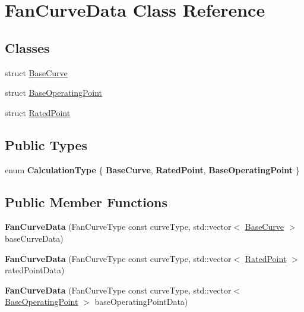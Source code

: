 \hypertarget{class_fan_curve_data}{}\section{Fan\+Curve\+Data Class Reference}
\label{class_fan_curve_data}
\subsection*{Classes}
\begin{DoxyCompactItemize}
\item 
struct \hyperlink{struct_fan_curve_data_1_1_base_curve}{Base\+Curve}
\item 
struct \hyperlink{struct_fan_curve_data_1_1_base_operating_point}{Base\+Operating\+Point}
\item 
struct \hyperlink{struct_fan_curve_data_1_1_rated_point}{Rated\+Point}
\end{DoxyCompactItemize}
\subsection*{Public Types}
\begin{DoxyCompactItemize}
\item 
\mbox{\label{class_fan_curve_data_af87fafad0a2a00e26ba82fb33b1a7282}} 
enum {\bfseries Calculation\+Type} \{ {\bfseries Base\+Curve}, 
{\bfseries Rated\+Point}, 
{\bfseries Base\+Operating\+Point}
 \}
\end{DoxyCompactItemize}
\subsection*{Public Member Functions}
\begin{DoxyCompactItemize}
\item 
\mbox{\label{class_fan_curve_data_a2419372103465feb9dca675d5391c489}} 
{\bfseries Fan\+Curve\+Data} (Fan\+Curve\+Type const curve\+Type, std\+::vector$<$ \hyperlink{struct_fan_curve_data_1_1_base_curve}{Base\+Curve} $>$ base\+Curve\+Data)
\item 
\mbox{\label{class_fan_curve_data_aab50cc3aa6ac0208d02691af715d72bb}} 
{\bfseries Fan\+Curve\+Data} (Fan\+Curve\+Type const curve\+Type, std\+::vector$<$ \hyperlink{struct_fan_curve_data_1_1_rated_point}{Rated\+Point} $>$ rated\+Point\+Data)
\item 
\mbox{\label{class_fan_curve_data_a06a924f8d9b61eabc3fcaf2b32fc9bff}} 
{\bfseries Fan\+Curve\+Data} (Fan\+Curve\+Type const curve\+Type, std\+::vector$<$ \hyperlink{struct_fan_curve_data_1_1_base_operating_point}{Base\+Operating\+Point} $>$ base\+Operating\+Point\+Data)
\end{DoxyCompactItemize}
